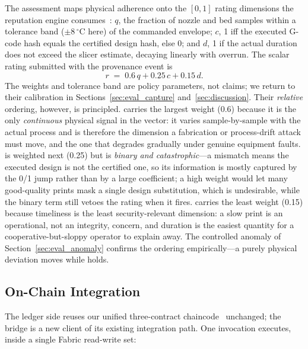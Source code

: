 The assessment maps physical adherence onto the $[0,1]$ rating dimensions
the reputation engine consumes~\cite{anonymous2026unified}:
 $q$, the fraction of nozzle and bed samples within a
tolerance band ($\pm 8\,^{\circ}$C here) of the commanded envelope;
 $c$, 1 iff the executed G-code hash equals the
certified design hash, else 0; and  $d$, 1 if the actual
duration does not exceed the slicer estimate, decaying linearly with
overrun.  The scalar rating submitted with the provenance event is
\begin{equation}
r \;=\; 0.6\,q + 0.25\,c + 0.15\,d .
\label{eq:rating}
\end{equation}
The weights and tolerance band are policy parameters, not claims; we
return to their calibration in Sections~\ref{sec:eval_capture}
and~\ref{sec:discussion}.  Their \emph{relative} ordering, however, is
principled.   carries the largest weight (0.6) because it is
the only \emph{continuous} physical signal in the vector: it varies
sample-by-sample with the actual process and is therefore the dimension a
fabrication or process-drift attack must move, and the one that degrades
gradually under genuine equipment faults.   is weighted
next (0.25) but is \emph{binary and catastrophic}---a mismatch means the
executed design is not the certified one, so its information is mostly
captured by the 0/1 jump rather than by a large coefficient; a high weight
would let many good-quality prints mask a single design substitution, which
is undesirable, while the binary term still vetoes the rating when it
fires.   carries the least weight (0.15) because timeliness
is the least security-relevant dimension: a slow print is an operational,
not an integrity, concern, and duration is the easiest quantity for a
cooperative-but-sloppy operator to explain away.  The controlled anomaly of
Section~\ref{sec:eval_anomaly} confirms the ordering empirically---a purely
physical deviation moves  while  holds.

\subsection{On-Chain Integration}
\label{sec:arch_integration}

The ledger side reuses our unified three-contract
chaincode~\cite{anonymous2026unified} unchanged; the bridge is a new
client of its existing integration path.  One
 invocation
executes, inside a single Fabric read-write set:

